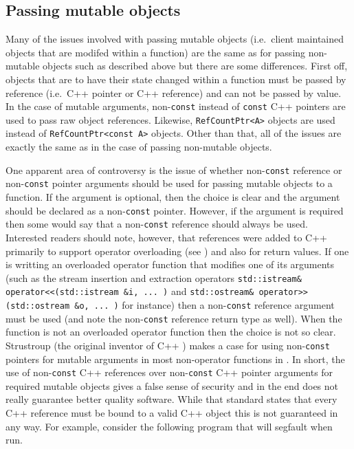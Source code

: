%
\subsection{Passing mutable objects}
%

Many of the issues involved with passing mutable objects (i.e.~client
maintained objects that are modifed within a function) are the same as
for passing non-mutable objects such as described above but there are
some differences.  First off, objects that are to have their state
changed within a function must be passed by reference (i.e.~C++
pointer or C++ reference) and can not be passed by value.  In the case
of mutable arguments, non-{}\texttt{const} instead of {}\texttt{const}
C++ pointers are used to pass raw object references.  Likewise,
{}\texttt{Ref\-Count\-Ptr<A>} objects are used instead of
{}\texttt{Ref\-Count\-Ptr<const A>} objects.  Other than that, all of
the issues are exactly the same as in the case of passing non-mutable
objects.

One apparent area of controversy is the issue of whether
non-\texttt{const} reference or non-\texttt{const} pointer arguments
should be used for passing mutable objects to a function.  If the
argument is optional, then the choice is clear and the argument should
be declared as a non-\texttt{const} pointer.  However, if the argument
is required then some would say that a non-\texttt{const} reference
should always be used.  Interested readers should note, however, that
references were added to C++ primarily to support operator overloading
(see {}\cite[Section 3.7]{ref:design_evol_cpp}) and also for return
values.  If one is writting an overloaded operator function that
modifies one of its arguments (such as the stream insertion and
extraction operators {}\texttt{std::istream\& operator<<(std::istream
\&i, ... )} and {}\texttt{std::ostream\& operator>>(std::ostream \&o,
... )} for instance) then a non-\texttt{const} reference argument must
be used (and note the non-\texttt{const} reference return type as
well).  When the function is not an overloaded operator function then
the choice is not so clear.  Strustroup (the original inventor of C++
{}\cite{ref:design_evol_cpp}) makes a case for using
non-\texttt{const} pointers for mutable arguments in most non-operator
functions in {}\cite[Section 5.5]{ref:stroustrup_2000}.  In short, the
use of non-{}\texttt{const} C++ references over non-{}\texttt{const}
C++ pointer arguments for required mutable objects gives a false sense
of security and in the end does not really guarantee better quality
software.  While that standard states that every C++ reference must be
bound to a valid C++ object this is not guaranteed in any way.  For example,
consider the following program that will segfault when run.

